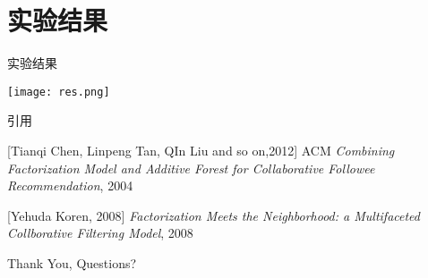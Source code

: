 \documentclass{beamer}
\begin{document}
\section{实验结果}
\begin{frame}{实验结果}
    \begin{center}
        \texttt{[image: res.png]}
    \end{center}
\end{frame}

\begin{frame}{引用}

\begin{thebibliography}{10}
 [Tianqi Chen, Linpeng Tan, QIn Liu and so on,2012]
    \newblock ACM
    \newblock \emph{Combining Factorization Model and Additive Forest for Collaborative Followee Recommendation}, 2004

 [Yehuda Koren, 2008]
    \newblock \emph{Factorization Meets the Neighborhood: a Multifaceted Collborative Filtering Model}, 2008
\end{thebibliography}
    
\end{frame}

\begin{frame}
    \begin{center}
        {\Large Thank You, Questions? }
    \end{center}
\end{frame}
\end{document}

